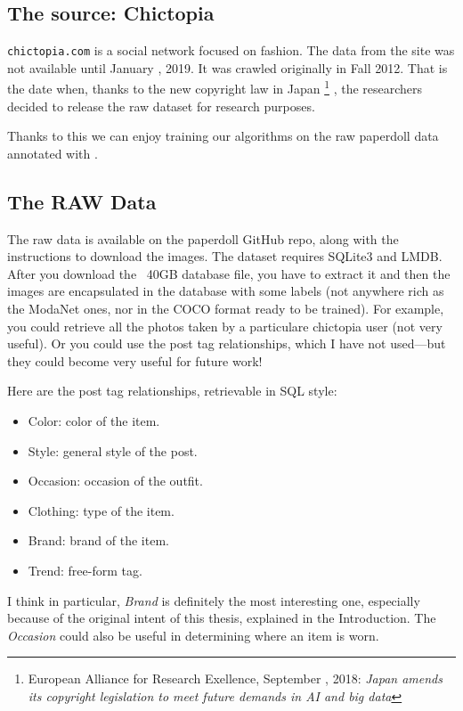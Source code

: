 \subsection{The source: Chictopia}\label{s:ds-paperdoll-chictopia}

\texttt{chictopia.com} is a social network focused on fashion.
The data from the site was not available until January , 2019. It was crawled originally in Fall 2012.
That is the date when, thanks to the new copyright law in Japan \footnote{European Alliance for Research Exellence, September , 2018: \emph{Japan amends its copyright legislation to meet future demands in AI and big data}}  , the researchers decided to release the raw dataset for research purposes.

Thanks to this we can enjoy training our algorithms on the raw paperdoll data annotated with \modanet.

\subsection{The RAW Data}\label{s:ds-paperdoll-raw}

The raw data is available on the paperdoll GitHub repo, along with the instructions to download the images.
The dataset requires SQLite3 and LMDB. After you download the ~40GB database file, you have to extract it and then the images are encapsulated in the database with some labels (not anywhere rich as the ModaNet ones, nor in the COCO format ready to be trained).
For example, you could retrieve all the photos taken by a particulare chictopia user (not very useful). Or you could use the post tag relationships, which I have not used—but they could become very useful for future work!

Here are the post tag relationships, retrievable in SQL style:
\begin{itemize}
	\item Color: color of the item.
	\item Style: general style of the post.
	\item Occasion: occasion of the outfit.
	\item Clothing: type of the item.
	\item Brand: brand of the item.
	\item Trend: free-form tag.
\end{itemize}

I think in particular, \emph{Brand} is definitely the most interesting one, especially because of the original intent of this thesis, explained in the Introduction. The \emph{Occasion} could also be useful in determining where an item is worn.

